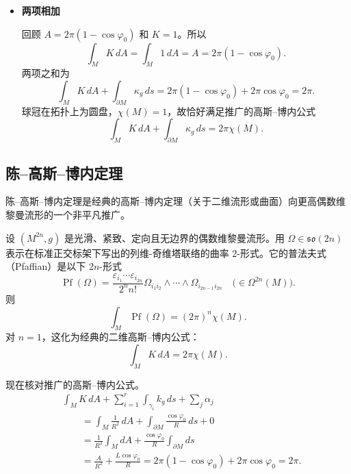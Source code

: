 \begin{itemize}
\begin{itemize}
    纬圆长 $L=2\pi\sin\varphi_0$，所以
    \[
      \int_{\partial M}\kappa_g\,ds=\kappa_gL
        =\frac{\cos\varphi_0\,2\pi\sin\varphi_0}{\sin\varphi_0}
        =2\pi\cos\varphi_0.
    \]
    \item \textbf{两项相加}

    回顾 $A=2\pi(1-\cos\varphi_0)$ 和 $K=1$。所以
    \[
      \int_M K\,dA=\int_M 1\,dA=A=2\pi(1-\cos\varphi_0).
    \]
    两项之和为
    \begin{equation*}
      \int_M K\,dA+\int_{\partial M}\kappa_g\,ds
        =2\pi(1-\cos\varphi_0)+2\pi\cos\varphi_0=2\pi.
      \tag{5.28}\label{eq:5.28}
    \end{equation*}
    球冠在拓扑上为圆盘，$\chi(M)=1$，故恰好满足推广的高斯–博内公式
    \begin{equation*}
      \int_M K\,dA+\int_{\partial M}\kappa_g\,ds=2\pi\chi(M).
      \tag{4.29}\label{eq:5-gb-4.29}
    \end{equation*}
  \end{itemize}
\end{itemize}

\subsection{陈–高斯–博内定理}
陈–高斯–博内定理是经典的高斯–博内定理（关于二维流形或曲面）向更高偶数维黎曼流形的一个非平凡推广。

设 $(M^{2n},g)$ 是光滑、紧致、定向且无边界的偶数维黎曼流形。用 $\Omega\in\mathfrak{so}(2n)$ 表示在标准正交标架下写出的列维-奇维塔联络的曲率 $2$-形式。它的普法夫式（Pfaffian）是以下 $2n$-形式
\begin{equation*}
  \operatorname{Pf}(\Omega)
    =\frac{\varepsilon_{i_1}\cdots\varepsilon_{i_{2n}}}{2^n n!}
      \Omega_{i_1i_2}\wedge\cdots\wedge\Omega_{i_{2n-1}i_{2n}}
      \quad\bigl(\in\Omega^{2n}(M)\bigr).
  \tag{5.30}\label{eq:5.30}
\end{equation*}
则
\[
  \int_M\operatorname{Pf}(\Omega)=(2\pi)^n\chi(M).
\]
对 $n=1$，这化为经典的二维高斯–博内公式：
\[
  \int_M K\,dA=2\pi\chi(M).
\]

现在核对推广的高斯–博内公式。
\[
  \begin{aligned}
   &\int_M K\,dA+\sum_{i=1}^r\int_{\gamma_i}k_g\,ds+\sum_j\alpha_j\\
   &\qquad=\int_M\frac1{R^2}\,dA+\int_{\partial M}\frac{\cos\varphi_0}{R}\,ds+0\\
   &\qquad=\frac1{R^2}\int_M dA+\frac{\cos\varphi_0}{R}\int_{\partial M}ds\\
   &\qquad=\frac{A}{R^2}+\frac{L\cos\varphi_0}{R}
          =2\pi(1-\cos\varphi_0)+2\pi\cos\varphi_0=2\pi.
  \end{aligned}
\]

